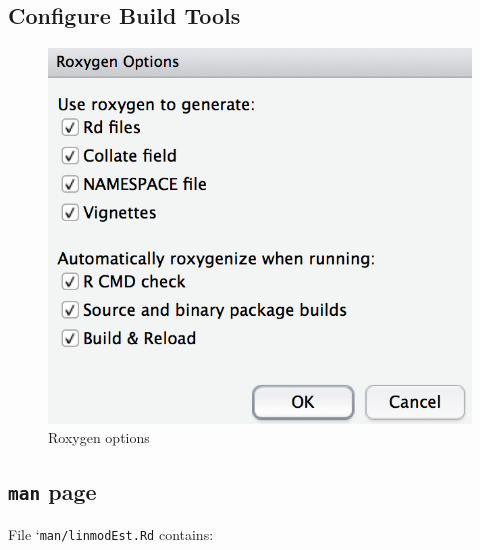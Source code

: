 \documentclass[]{book}
\theoremstyle{definition}
\theoremstyle{definition}
\theoremstyle{definition}
\theoremstyle{remark}
\begin{document}
\subsection{Configure Build Tools}\label{configure-build-tools}

\begin{figure}

{\centering \includegraphics{images/ch3_configure_build_tools} 

}

\caption{Roxygen options}\label{fig:pkg8}
\end{figure}

\subsection{\texorpdfstring{\texttt{man}
page}{man page}}\label{man-page}

File `\texttt{man/linmodEst.Rd} contains:
\end{document}
